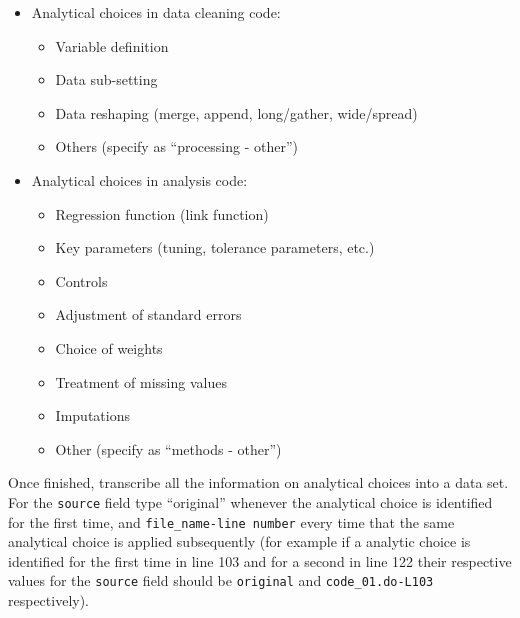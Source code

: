 \documentclass[]{book}
\providecommand{\tightlist}{%
  \setlength{\itemsep}{0pt}\setlength{\parskip}{0pt}}
\begin{document}
\begin{itemize}
\tightlist
\item
  Analytical choices in data cleaning code:

  \begin{itemize}
  \tightlist
  \item
    Variable definition\\
  \item
    Data sub-setting\\
  \item
    Data reshaping (merge, append, long/gather, wide/spread)\\
  \item
    Others (specify as ``processing - other'')
  \end{itemize}
\item
  Analytical choices in analysis code:

  \begin{itemize}
  \tightlist
  \item
    Regression function (link function)\\
  \item
    Key parameters (tuning, tolerance parameters, etc.)\\
  \item
    Controls\\
  \item
    Adjustment of standard errors\\
  \item
    Choice of weights\\
  \item
    Treatment of missing values\\
  \item
    Imputations
  \item
    Other (specify as ``methods - other'')
  \end{itemize}
\end{itemize}

Once finished, transcribe all the information on analytical choices into a data set. For the \texttt{source} field type ``original'' whenever the analytical choice is identified for the first time, and \texttt{file\_name-line\ number} every time that the same analytical choice is applied subsequently (for example if a analytic choice is identified for the first time in line 103 and for a second in line 122 their respective values for the \texttt{source} field should be \texttt{original} and \texttt{code\_01.do-L103} respectively).
\end{document}
